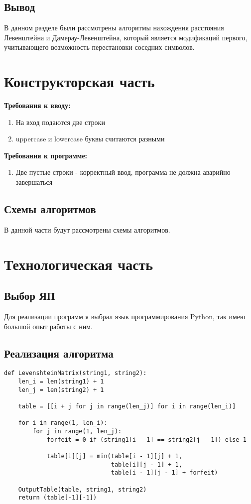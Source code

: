 \documentclass[12pt]{report}
\begin{document}
		\section{Вывод}
		В данном разделе были рассмотрены алгоритмы нахождения расстояния Левенштейна и Дамерау-Левенштейна, который является модификаций первого, учитывающего возможность перестановки соседних символов. 




\chapter{Конструкторская часть}
\textbf{Требования к вводу:}
\begin{enumerate}
  	\item На вход подаются две строки
	\item uppercase и lowercase буквы считаются разными
\end{enumerate}
\textbf{Требования к программе:}
\begin{enumerate}
  	\item Две пустые строки - корректный ввод, программа не должна аварийно завершаться
\end{enumerate}
\section{Схемы алгоритмов}
В данной части будут рассмотрены схемы алгоритмов.


\chapter{Технологическая часть}
\section{Выбор ЯП}
Для реализации программ я выбрал язык программирования Python, так имею большой опыт работы с ним.


\section{Реализация алгоритма}

\begin{lstlisting}[label=some-code,caption=Функция нахождения расстояния Левенштейна матрично]
def LevenshteinMatrix(string1, string2):
    len_i = len(string1) + 1
    len_j = len(string2) + 1

    table = [[i + j for j in range(len_j)] for i in range(len_i)]

    for i in range(1, len_i):
        for j in range(1, len_j):
            forfeit = 0 if (string1[i - 1] == string2[j - 1]) else 1

            table[i][j] = min(table[i - 1][j] + 1,
                              table[i][j - 1] + 1,
                              table[i - 1][j - 1] + forfeit)

    OutputTable(table, string1, string2)
    return (table[-1][-1])
\end{lstlisting}
\end{document}
